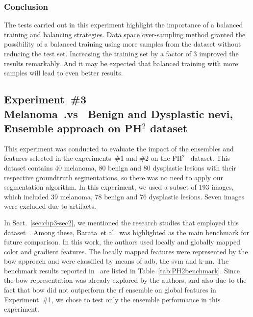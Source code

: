 \subsubsection{Conclusion}
The tests carried out in this experiment highlight the importance of a balanced training and balancing strategies. 
Data space over-sampling method granted the possibility of a balanced training using more samples from the dataset without reducing the test set. 
Increasing the training set by a factor of 3 improved the results remarkably. 
And it may be expected that balanced training with more samples will lead to even better results.

\subsection{Experiment~\#3\\
\small{Melanoma~.vs~ Benign and Dysplastic nevi, Ensemble approach on PH$^{2}$ dataset}}
This experiment was conducted to evaluate the impact of the ensembles and features selected in the experiments~\#1 and \#2 on the PH$^{2}$~\cite{mendoncca2013ph} dataset.
This dataset contains 40 melanoma, 80 benign and 80 dysplastic lesions with their respective groundtruth segmentations, so there was no need to apply our segmentation algorithm.
In this experiment, we used a subset of 193 images, which included 39 melanoma, 78 benign and 76 dysplastic lesions.
Seven images were excluded due to artifacts.

In Sect.~\ref{sec:chp3-sec2}, we mentioned the research studies that employed this dataset~\cite{barata2013two,barata2013towards,ruela2013role,ruela2013color}.
Among these, Barata~et al.\,\cite{barata2013two} was highlighted as the main benchmark for future comparison.
In this work, the authors used locally and globally mapped color and gradient features. 
The locally mapped features were represented by the \ac{bow} approach and were classified by means of \ac{adb}, the \ac{svm} and k-\ac{nn}.
The benchmark results reported in~\cite{barata2013two} are listed in Table~\ref{tab:PH2benchmark}.
Since the \ac{bow} representation was already explored by the authors, and also due to the fact that \ac{bow} did not outperform the \ac{rf} ensemble on global features in Experiment~\#1, we chose to test only the ensemble performance in this experiment.


